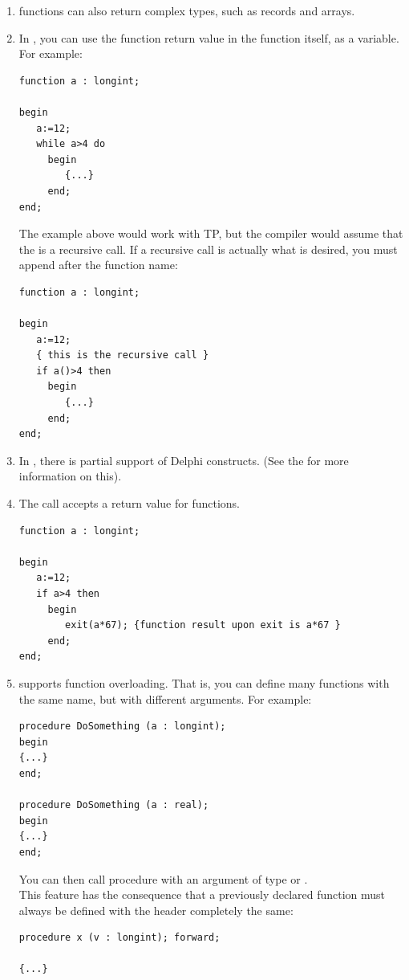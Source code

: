 \begin{enumerate}
\item \fpc functions can also return complex types, such as records and arrays.
\item In \fpc, you can use the function return value in the function itself, as a
variable. For example:
\begin{verbatim}
function a : longint;

begin
   a:=12;
   while a>4 do
     begin
        {...}
     end;
end;
\end{verbatim}
The example above would work with TP, but the compiler would assume
that the  is a recursive call. If a recursive call is actually what
is desired, you must append \var{()} after the function name:
\begin{verbatim}
function a : longint;

begin
   a:=12;
   { this is the recursive call }
   if a()>4 then
     begin
        {...}
     end;
end;
\end{verbatim}
\item In \fpc, there is partial support of Delphi constructs. (See the \progref for
more information on this).
\item The \fpc {} call accepts a return value for functions.
\begin{verbatim}
function a : longint;

begin
   a:=12;
   if a>4 then
     begin
        exit(a*67); {function result upon exit is a*67 }
     end;
end;
\end{verbatim}
\item \fpc supports function overloading. That is, you can define many
functions with the same name, but with different arguments. For example:
\begin{verbatim}
procedure DoSomething (a : longint);
begin
{...}
end;

procedure DoSomething (a : real);
begin
{...}
end;
\end{verbatim}
You can then call procedure  with an argument of type
 or .\\
This feature has the consequence that a previously declared function must
always be defined with the header completely the same:
\begin{verbatim}
procedure x (v : longint); forward;

{...}


\end{verbatim}
\end{enumerate}
